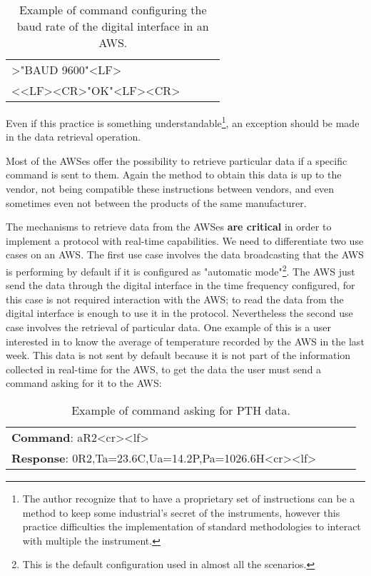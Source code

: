 \begin{table}[hc]
\centering
\begin{tabular}{ | l | l | l | l |}
\hline    
>"BAUD 9600"<LF> \\
<<LF><CR>"OK"<LF><CR>\\
\hline
\end{tabular}
\caption{Example of command configuring the baud rate of the digital interface in an \protect \gls{AWS}.}
\end{table}

Even if this practice is something understandable\footnote{The author recognize that to have a proprietary set of instructions can be a method to keep some industrial's secret of the instruments, however this practice difficulties the implementation of standard methodologies to interact with multiple the instrument.}, an exception should be made in the data retrieval operation.

Most of the \gls{AWS}es offer the possibility to retrieve particular data if a specific command is sent to them. Again the method to obtain this data is up to the vendor, not being compatible these instructions between vendors, and even sometimes even not between the products of the same manufacturer.

The mechanisms to retrieve data from the \gls{AWS}es \textbf{are critical} in order to implement a protocol with real-time capabilities. We need to differentiate  two use cases on an \gls{AWS}. The first use case involves the data broadcasting that the \gls{AWS} is performing by default if it is configured as "automatic mode"\footnote{This is the default configuration used in almost all the scenarios.}. The \gls{AWS} just send the data through the digital interface in the time frequency configured, for this case is not required interaction with the \gls{AWS}; to read the data from the digital interface is enough to use it in the protocol. Nevertheless the second use case involves the retrieval of particular data. One example of this is a user interested in to know the average of temperature recorded by the \gls{AWS} in the last week. This data is not sent by default because it is not part of the information collected in real-time for the \gls{AWS}, to get the data the user must send a command asking for it to the \gls{AWS}:

\begin{table}[hc]
\centering
\begin{tabular}{ | l | l | l | l |}
\hline    
\textbf{Command}:  aR2<cr><lf> \\
\textbf{Response}: 0R2,Ta=23.6C,Ua=14.2P,Pa=1026.6H<cr><lf>\\
\hline
\end{tabular}
\caption{Example of command asking for \protect \gls{PTH} data.}
\end{table}

